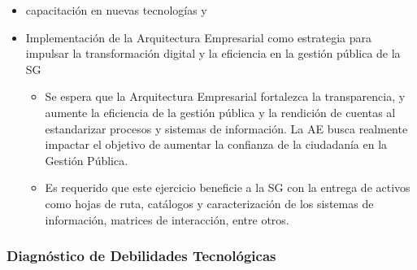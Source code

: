 \documentclass[
	a4paper, %
	12pt, %
]{include/CSSullivanBusinessReport}
\def\tightlist{}
\begin{document}
\begin{itemize}
  \begin{itemize}
  \tightlist
  \item
    Se busca la consolidación de herramientas, canales e información
    para fortalecer la oferta y celeridad de servicios y la
    participación ciudadana. Esto incluye el seguimiento a canales de
    atención virtual como SuperCADE Virtual, chat, chat-Bot y (video)
    llamadas de la línea 195.
  \item
    Se busca optimizar los procesos de recolección, análisis y
    divulgación de la información mediante la implementación de sistemas
    de información que incluyan la automatización de la recolección de
    datos y el uso de herramientas analíticas.
  \item
    Es destacado que el Distrito unifica en el portal Bogotá su oferta
    de trámites y servicios, como el realizar pagos en línea (no
    tributarios) y agendamiento de citas en la RedCADE desde casa;
    esfuerzo que debe continuar y extenderse a los más de 1.400 trámites
    y servicios. Esto representa una mejora significativa en la
    accesibilidad y eficiencia de los servicios digitales para la
    ciudadanía.
  \end{itemize}
\item
  capacitación en nuevas tecnologías y
\item
  Implementación de la Arquitectura Empresarial como estrategia para
  impulsar la transformación digital y la eficiencia en la gestión
  pública de la SG

  \begin{itemize}
  \tightlist
  \item
    Se espera que la Arquitectura Empresarial fortalezca la
    transparencia, y aumente la eficiencia de la gestión pública y la
    rendición de cuentas al estandarizar procesos y sistemas de
    información. La AE busca realmente impactar el objetivo de aumentar
    la confianza de la ciudadanía en la Gestión Pública.
  \item
    Es requerido que este ejercicio beneficie a la SG con la entrega de
    activos como hojas de ruta, catálogos y caracterización de los
    sistemas de información, matrices de interacción, entre otros.
  \end{itemize}
\end{itemize}

\subsubsection{Diagnóstico de Debilidades
Tecnológicas}\label{sec:diagnuxf3stico-de-debilidades-tecnoluxf3gicas}
\end{document}
